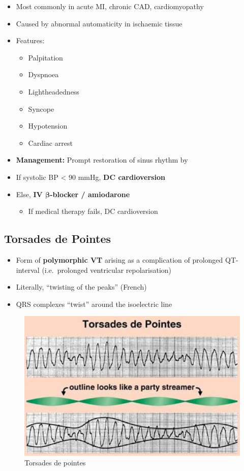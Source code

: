 \documentclass[
  12pt,
]{memoir}
\providecommand{\tightlist}{%
  \setlength{\itemsep}{0pt}\setlength{\parskip}{0pt}}
\begin{document}
\begin{itemize}
\tightlist
\item
  Most commonly in acute MI, chronic CAD, cardiomyopathy
\item
  Caused by abnormal automaticity in ischaemic tissue
\item
  Features:

  \begin{itemize}
  \tightlist
  \item
    Palpitation
  \item
    Dyspnoea
  \item
    Lightheadedness
  \item
    Syncope
  \item
    Hypotension
  \item
    Cardiac arrest
  \end{itemize}
\item
  \textbf{Management:} Prompt restoration of sinus rhythm by
\item
  If systolic BP \textless{} 90 mmHg, \textbf{DC cardioversion}
\item
  Else, \textbf{IV \(\boldsymbol\beta\)-blocker / amiodarone}

  \begin{itemize}
  \tightlist
  \item
    If medical therapy fails, DC cardioversion
  \end{itemize}
\end{itemize}

\hypertarget{torsades-de-pointes}{%
\subsection{Torsades de Pointes}\label{torsades-de-pointes}}

\begin{itemize}
\tightlist
\item
  Form of \textbf{polymorphic VT} arising as a complication of prolonged
  QT- interval (i.e.~prolonged ventricular repolarisation)
\item
  Literally, ``twisting of the peaks'' (French)
\item
  QRS complexes ``twist'' around the isoelectric line
\end{itemize}

\begin{figure}[h!]
    \centering
    \includegraphics[width=.7\textwidth]{../assets/med/torsades.png}
    \vspace{4mm}
    \caption{Torsades de pointes}
\end{figure}
\end{document}
